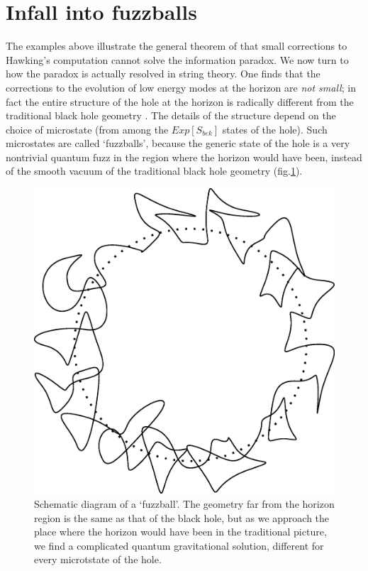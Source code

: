 \documentclass[12pt]{article}
\begin{document}
\section{Infall into fuzzballs}

The examples above illustrate the general theorem of \cite{mathurfuzz} that small corrections to Hawking's computation cannot solve the information paradox. We now turn to how the paradox is actually resolved in string theory. One finds that the corrections to the evolution of low energy modes at the horizon are {\it not small}; in fact the entire structure of the hole at the horizon is radically different from the traditional black hole geometry \cite{fuzzball1,fuzzball2}. The details of the structure depend on the choice of microstate (from among the $Exp[S_{bek}]$ states of the hole). Such microstates are called `fuzzballs', because the generic state of the hole is a very nontrivial quantum fuzz in the region where the horizon would have been, instead of the smooth vacuum of the traditional black hole geometry (fig.\ref{ftwop}).

\begin{figure}[htbp]
\begin{center}
\includegraphics[scale=.25]{ftwop.eps}
\caption{Schematic diagram of a `fuzzball'. The geometry far from the horizon region is the same as that of the black hole, but as we approach the place where the horizon would have been in the traditional picture,  we find a complicated quantum gravitational solution, different for every microtstate of the hole.}
\label{ftwop}
\end{center}
\end{figure}
\end{document}
